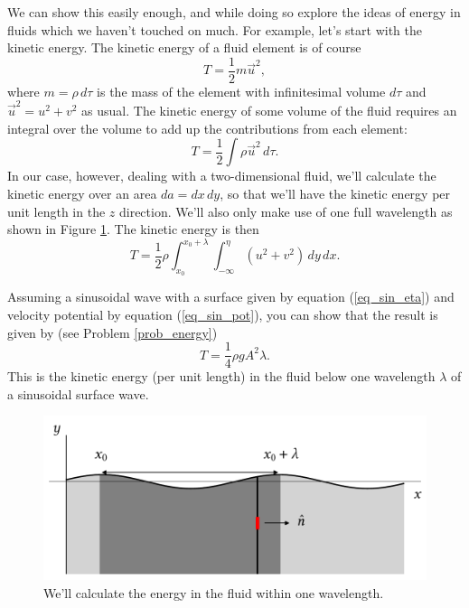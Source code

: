 We can show this easily enough, and while doing so explore the ideas of energy in fluids which we haven't touched on much.  For example, let's start with the kinetic energy.  The kinetic energy of a fluid element is of course
\[
T = \frac{1}{2} m \vec{u}^2,
\]
where $m = \rho \, d\tau$ is the mass of the element with infinitesimal volume $d\tau$ and $\vec{u}^2 = u^2 + v^2$ as usual.  The kinetic energy of some volume of the fluid requires an integral over the volume to add up the contributions from each element:
\begin{equation}
T = \frac{1}{2} \int \rho \vec{u}^2 \, d \tau.
\end{equation}
In our case, however, dealing with a two-dimensional fluid, we'll calculate the kinetic energy over an area $da = dx \, dy$, so that we'll have the kinetic energy per unit length in the $z$ direction.  We'll also only make use of one full wavelength as shown in Figure \ref{fig_wave_energy}. The kinetic energy is then
\begin{equation}
T = \frac{1}{2} \rho \int_{x_0}^{x_0 + \lambda} \int_{-\infty}^{\eta} (u^2 + v^2) \, dy \, dx.
\end{equation} 

Assuming a sinusoidal wave with a surface given by equation (\ref{eq_sin_eta}) and velocity potential by equation (\ref{eq_sin_pot}), you can show that the result is given by (see Problem \ref{prob_energy})
\begin{equation}
\label{eq_kin_energy_wave}
T = \frac{1}{4} \rho g A^2 \lambda.
\end{equation}
This is the kinetic energy (per unit length) in the fluid below one wavelength $\lambda$ of a sinusoidal surface wave.

\begin{figure}
\centering\includegraphics[width=0.8\linewidth]{Figures/Chapter5/fig_wave_energy}
\caption{We'll calculate the energy in the fluid within one wavelength.}
\label{fig_wave_energy}
\end{figure}

